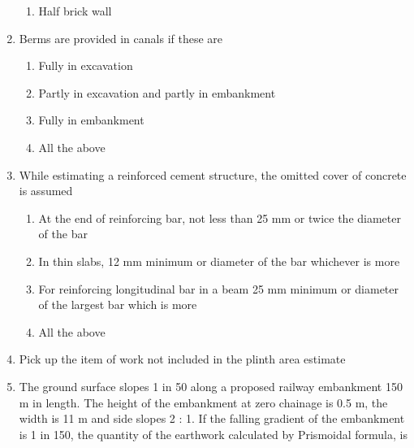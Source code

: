 \documentclass[11pt,a4paper]{article}
\begin{document}
\begin{enumerate}
\begin{enumerate}[label=\Alph*.]
\item{Half brick wall}
\end{enumerate}
\item{Berms are provided in canals if these are}
\begin{enumerate}[label=\Alph*.]
\item{Fully in excavation}
\item{Partly in excavation and partly in embankment}
\item{Fully in embankment}
\item{All the above}
\end{enumerate}
\item{While estimating a reinforced cement structure, the omitted cover of concrete is assumed}
\begin{enumerate}[label=\Alph*.]
\item{At the end of reinforcing bar, not less than 25 mm or twice the diameter of the bar}
\item{In thin slabs, 12 mm minimum or diameter of the bar whichever is more}
\item{For reinforcing longitudinal bar in a beam 25 mm minimum or diameter of the largest bar which is more}
\item{All the above}
\end{enumerate}
\item{Pick up the item of work not included in the plinth area estimate}
\\
\item{The ground surface slopes 1 in 50 along a proposed railway embankment 150 m in length. The height of the embankment at zero chainage is 0.5 m, the width is 11 m and side slopes 2 : 1. If the falling gradient of the embankment is 1 in 150, the quantity of the earthwork calculated by Prismoidal formula, is}
\\
\end{enumerate}
\end{document}
